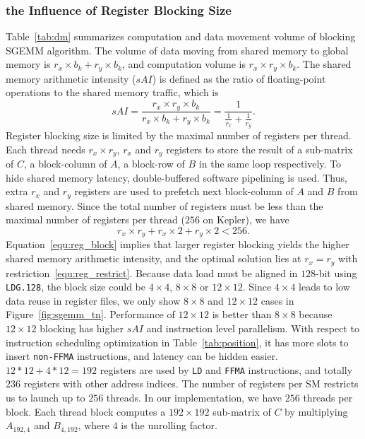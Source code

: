 \subsubsection{the Influence of Register Blocking Size}
Table~\ref{tab:dm} summarizes computation and data movement volume of blocking SGEMM algorithm.
The volume of data moving from shared memory to global memory is $r_x\times b_k+ r_y\times b_k$, and computation volume is $r_x\times r_y\times b_k$. 
The shared memory arithmetic intensity ($sAI$) is defined as the ratio of floating-point operations to the shared memory traffic, which is 
\begin{equation}
sAI = \frac {r_x\times 
r_y\times b_k} {r_x\times b_k+ r_y\times b_k} = \frac{1}{\frac{1}{r_x} + \frac{1}{r_y}}.
    \label{equ:reg_block}
\end{equation}
Register blocking size is limited by the maximal number of registers per thread. 
Each thread needs $r_x\times r_y$, $r_x$ and $r_y$ registers to store the result of a sub-matrix of $C$,  a block-column of
$A$,  a block-row of $B$ in the same loop respectively.
To hide shared memory latency, double-buffered software pipelining is used. Thus, extra $r_x$ and $r_y$ registers
are used to prefetch next block-column of $A$ and $B$ from shared memory. 
Since the total number of registers must be less than the maximal number of registers per thread ($256$ on Kepler), we have
\begin{equation}
    r_x\times r_y + r_x\times 2 + r_y\times 2 < 256.
\label{equ:reg_restrict}
\end{equation}
Equation~\ref{equ:reg_block} implies that larger register blocking yields the higher shared memory arithmetic intensity,
and the optimal solution lies at $r_x=r_y$ with restriction~\ref{equ:reg_restrict}. 
Because data load must be aligned in $128$-bit using 
{\tt LDG.128}, the block size could be $4\times 4$, $8\times 8$ or $12\times 12$. 
Since $4\times 4$ leads to low data reuse in register files, we only show $8\times8$ and $12\times12$ cases in Figure~\ref{fig:sgemm_tn}.
Performance of $12\times12$ is better than $8\times8$ because $12\times12$ blocking has higher $sAI$ and instruction
level parallelism. With respect to 
instruction scheduling optimization in Table~\ref{tab:position}, it has more slots to insert {\tt non-FFMA}
instructions, and latency can be hidden easier.
$12*12+4*12=192$ registers are used by {\tt LD} and {\tt FFMA} instructions, and totally $236$ registers with
other address indices. The number of registers per SM restricts us to launch up to $256$ threads. 
In our implementation, we have $256$ threads per block. 
Each thread block computes a $192\times 192$ sub-matrix of $C$ by multiplying $A_{192,4}$ and $B_{4, 192}$, where $4$ is the unrolling factor.

